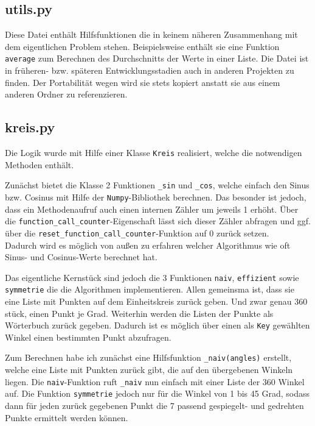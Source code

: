 \documentclass{scrartcl}
\begin{document}
	\subsection{utils.py}
	
	Diese Datei enthält Hilfsfunktionen die in keinem näheren Zusammenhang mit dem eigentlichen Problem stehen. Beispielsweise enthält sie eine Funktion \verb|average| zum Berechnen des Durchschnitts der Werte in einer Liste. Die Datei ist in früheren- bzw. späteren Entwicklungsstadien auch in anderen Projekten zu finden. Der Portabilität wegen wird sie stets kopiert anstatt sie aus einem anderen Ordner zu referenzieren.
	
	\subsection{kreis.py}
	
	Die Logik wurde mit Hilfe einer Klasse \verb|Kreis| realisiert, welche die notwendigen Methoden enthält.
	
	Zunächst bietet die Klasse 2 Funktionen \verb|_sin| und \verb|_cos|, welche einfach den Sinus bzw. Cosinus mit Hilfe der \verb|Numpy|-Bibliothek berechnen. Das besonder ist jedoch, dass ein Methodenaufruf auch einen internen Zähler um jeweils 1 erhöht. Über die \verb|function_call_counter|-Eigenschaft lässt sich dieser Zähler abfragen und ggf. über die \verb|reset_function_call_counter|-Funktion auf 0 zurück setzen. \\
	Dadurch wird es möglich von außen zu erfahren welcher Algorithmus wie oft Sinus- und Cosinus-Werte berechnet hat.
	
	Das eigentliche Kernstück sind jedoch die 3 Funktionen \verb|naiv|, \verb|effizient| sowie \verb|symmetrie| die die Algorithmen implementieren. Allen gemeinsma ist, dass sie eine Liste mit Punkten auf dem Einheitskreis zurück geben. Und zwar genau 360 stück, einen Punkt je Grad. Weiterhin werden die Listen der Punkte als Wörterbuch zurück gegeben. Dadurch ist es möglich über einen als \verb|Key| gewählten Winkel einen bestimmten Punkt abzufragen.
	
	Zum Berechnen habe ich zunächst eine Hilfsfunktion \verb|_naiv(angles)| erstellt, welche eine Liste mit Punkten zurück gibt, die auf den übergebenen Winkeln liegen. Die \verb|naiv|-Funktion ruft \verb|_naiv| nun einfach mit einer Liste der 360 Winkel auf. Die Funktion \verb|symmetrie| jedoch nur für die Winkel von 1 bis 45 Grad, sodass dann für jeden zurück gegebenen Punkt die 7 passend gespiegelt- und gedrehten Punkte ermittelt werden können.
	
\end{document}
